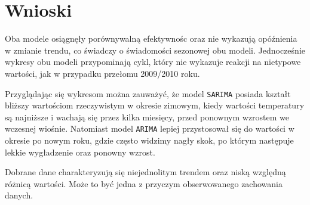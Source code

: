 \documentclass[12pt]{article}
\begin{document}
\newpage
\section{Wnioski}

Oba modele osiągnęły porównywalną efektywnośc oraz nie wykazują opóźnienia w zmianie trendu, co świadczy o świadomości sezonowej obu modeli. Jednocześnie wykresy obu modeli przypominają cykl, który nie wykazuje reakcji na nietypowe wartości, jak w przypadku przełomu 2009/2010 roku.

Przyglądając się wykresom można zauważyć, że model \texttt{SARIMA} posiada kształt bliższy wartościom rzeczywistym w okresie zimowym, kiedy wartości temperatury są najniższe i wachają się przez kilka miesięcy, przed ponownym wzrostem we wczesnej wiośnie. Natomiast model \texttt{ARIMA} lepiej przystosował się do wartości w okresie po nowym roku, gdzie często widzimy nagły skok, po którym następuje lekkie wygładzenie oraz ponowny wzrost.

Dobrane dane charakteryzują się niejednolitym trendem oraz niską względną różnicą wartości. Może to być jedna z przyczym obserwowanego zachowania danych.
\end{document}
